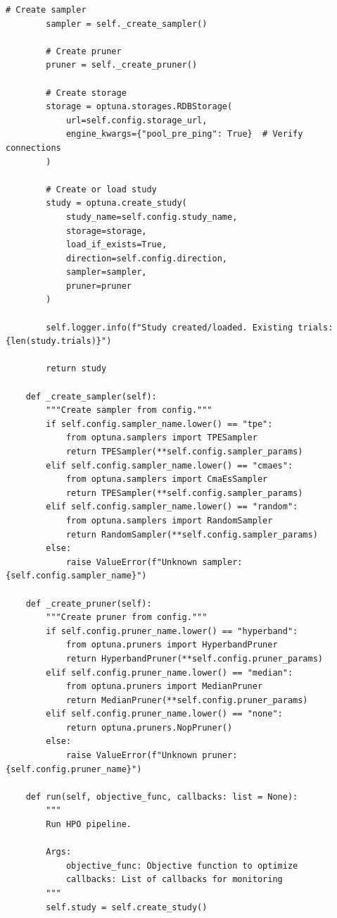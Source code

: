 \begin{lstlisting}[style=python, caption=Production-grade automated HPO pipeline]
        # Create sampler
        sampler = self._create_sampler()

        # Create pruner
        pruner = self._create_pruner()

        # Create storage
        storage = optuna.storages.RDBStorage(
            url=self.config.storage_url,
            engine_kwargs={"pool_pre_ping": True}  # Verify connections
        )

        # Create or load study
        study = optuna.create_study(
            study_name=self.config.study_name,
            storage=storage,
            load_if_exists=True,
            direction=self.config.direction,
            sampler=sampler,
            pruner=pruner
        )

        self.logger.info(f"Study created/loaded. Existing trials: {len(study.trials)}")

        return study

    def _create_sampler(self):
        """Create sampler from config."""
        if self.config.sampler_name.lower() == "tpe":
            from optuna.samplers import TPESampler
            return TPESampler(**self.config.sampler_params)
        elif self.config.sampler_name.lower() == "cmaes":
            from optuna.samplers import CmaEsSampler
            return TPESampler(**self.config.sampler_params)
        elif self.config.sampler_name.lower() == "random":
            from optuna.samplers import RandomSampler
            return RandomSampler(**self.config.sampler_params)
        else:
            raise ValueError(f"Unknown sampler: {self.config.sampler_name}")

    def _create_pruner(self):
        """Create pruner from config."""
        if self.config.pruner_name.lower() == "hyperband":
            from optuna.pruners import HyperbandPruner
            return HyperbandPruner(**self.config.pruner_params)
        elif self.config.pruner_name.lower() == "median":
            from optuna.pruners import MedianPruner
            return MedianPruner(**self.config.pruner_params)
        elif self.config.pruner_name.lower() == "none":
            return optuna.pruners.NopPruner()
        else:
            raise ValueError(f"Unknown pruner: {self.config.pruner_name}")

    def run(self, objective_func, callbacks: list = None):
        """
        Run HPO pipeline.

        Args:
            objective_func: Objective function to optimize
            callbacks: List of callbacks for monitoring
        """
        self.study = self.create_study()


\end{lstlisting}
